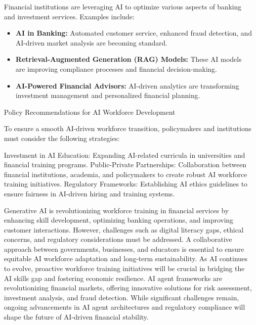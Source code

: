 \documentclass[a4paper,headinclude=on,footinclude=on,12pt,oneside]{scrbook}
\begin{document}

Financial institutions are leveraging AI to optimize various aspects of banking and investment services. Examples include:
\begin{itemize}
	\item \textbf{AI in Banking:} Automated customer service, enhanced fraud detection, and AI-driven market analysis are becoming standard.
	\item \textbf{Retrieval-Augmented Generation (RAG) Models:} These AI models are improving compliance processes and financial decision-making.
	\item \textbf{AI-Powered Financial Advisors:} AI-driven analytics are transforming investment management and personalized financial planning.
\end{itemize}

Policy Recommendations for AI Workforce Development

To ensure a smooth AI-driven workforce transition, policymakers and institutions must consider the following strategies:

Investment in AI Education: Expanding AI-related curricula in universities and financial training programs.
Public-Private Partnerships: Collaboration between financial institutions, academia, and policymakers to create robust AI workforce training initiatives.
Regulatory Frameworks: Establishing AI ethics guidelines to ensure fairness in AI-driven hiring and training systems.



Generative AI is revolutionizing workforce training in financial services by enhancing skill development, optimizing banking operations, and improving customer interactions. However, challenges such as digital literacy gaps, ethical concerns, and regulatory considerations must be addressed. A collaborative approach between governments, businesses, and educators is essential to ensure equitable AI workforce adaptation and long-term sustainability. As AI continues to evolve, proactive workforce training initiatives will be crucial in bridging the AI skills gap and fostering economic resilience.
AI agent frameworks are revolutionizing financial markets, offering innovative solutions for risk assessment, investment analysis, and fraud detection. While significant challenges remain, ongoing advancements in AI agent architectures and regulatory compliance will shape the future of AI-driven financial stability.
\end{document}
